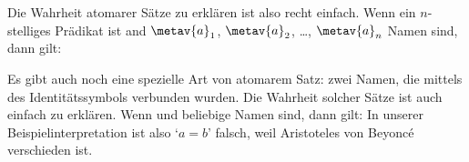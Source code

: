 Die Wahrheit atomarer Sätze zu erklären ist also recht einfach. Wenn  ein $n$-stelliges Prädikat ist and $\metav{a}_1$, $\metav{a}_{2}$, \dots, $\metav{a}_{n}$ Namen sind, dann gilt:


Es gibt auch noch eine spezielle Art von atomarem Satz: zwei Namen, die mittels des Identitätssymbols verbunden wurden. Die Wahrheit solcher Sätze ist auch einfach zu erklären. Wenn  und  beliebige Namen sind, dann gilt: 
In unserer Beispielinterpretation ist also `$a = b$' falsch, weil Aristoteles von Beyonc\'e verschieden ist.

